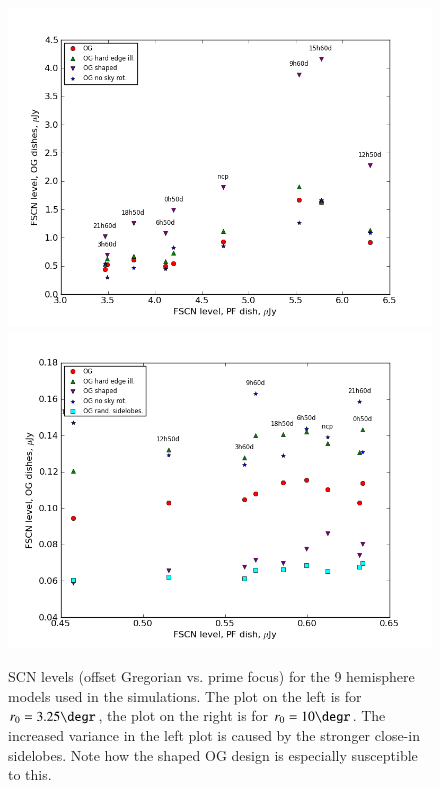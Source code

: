 \documentclass{aa}
\begin{document}
\begin{figure}
  \includegraphics[width=\columnwidth]{cc-fields-325}
  \includegraphics[width=\columnwidth]{cc-fields-10}
\caption{\label{fig:fscn-fields}SCN levels (offset Gregorian vs. prime focus) for the 9 hemisphere models used in the simulations. The plot on the left is for $r_0=3.25\degr$, the plot on the right is for $r_0=10\degr$. The increased variance in the left plot is caused by the stronger close-in sidelobes. Note how the shaped OG design is especially susceptible to this.}
\end{figure}
\end{document}
